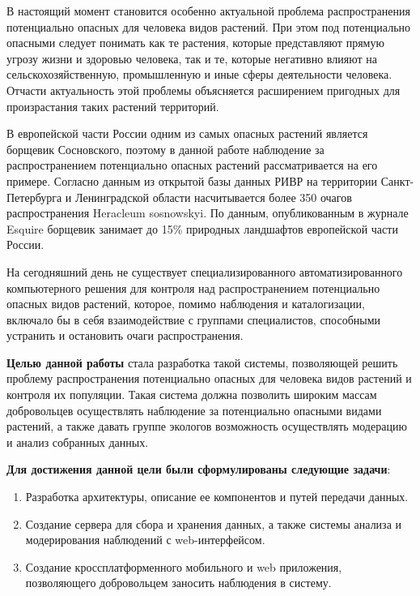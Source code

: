 

\tab
В настоящий момент становится особенно актуальной проблема распространения потенциально опасных для человека видов растений.
При этом под потенциально опасными следует понимать как те растения, которые представляют прямую угрозу жизни и здоровью человека, так и те, которые негативно влияют на сельскохозяйственную, промышленную и иные сферы деятельности человека\cite{alien-plants}.
Отчасти актуальность этой проблемы объясняется расширением пригодных для произрастания таких растений территорий\cite{invasive-plants}.

\nwln
В европейской части России одним из самых опасных растений является борщевик Сосновского\cite{heracleum}, поэтому в данной работе наблюдение за распространением потенциально опасных растений рассматривается на его примере.
Согласно данным из открытой базы данных РИВР\cite{rivr} на территории Санкт-Петербурга и Ленинградской области насчитывается более 350 очагов распространения Heracleum sosnowskyi.
По данным, опубликованным в журнале Esquire\cite{esquire} борщевик занимает до 15\% природных ландшафтов европейской части России.

\nwln
На сегодняшний день не существует специализированного автоматизированного компьютерного решения для контроля над распространением потенциально опасных видов растений, которое, помимо наблюдения и каталогизации, включало бы в себя взаимодействие с группами специалистов, способными устранить и остановить очаги распространения.

\nwln
\textbf{Целью данной работы} стала разработка такой системы, позволяющей решить проблему распространения потенциально опасных для человека видов растений и контроля их популяции.
Такая система должна позволить широким массам добровольцев осуществлять наблюдение за потенциально опасными видами растений, а также давать группе экологов возможность осуществлять модерацию и анализ собранных данных.

\nwln
\textbf{Для достижения данной цели были сформулированы следующие задачи}:
\begin{enumerate}[topsep=0pt, parsep=0pt, itemsep=0pt, wide=0.5cm]
	\item Разработка архитектуры, описание ее компонентов и путей передачи данных.
	\item Создание сервера для сбора и хранения данных, а также системы анализа и модерирования наблюдений с web-интерфейсом.
	\item Создание кроссплатформенного мобильного и web приложения, позволяющего добровольцем заносить наблюдения в систему.
\end{enumerate}

